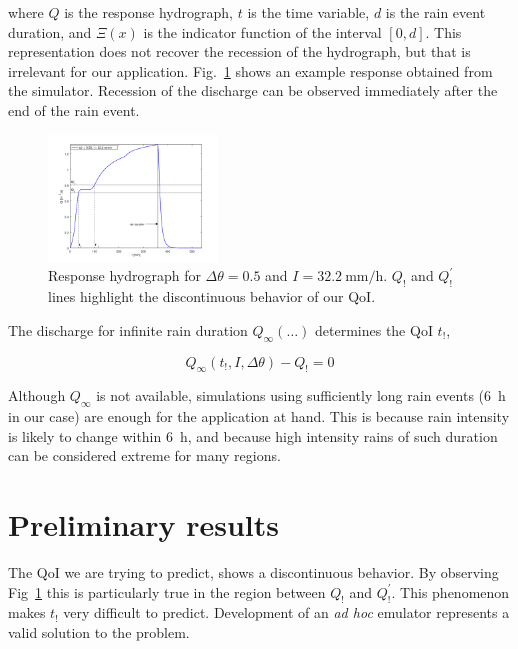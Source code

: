 \documentclass[12pt,a4paper,english,twocolumn,fleqn]{narms}
\newcommand{\jpi}[1]{{\color{Magenta} JPi: #1}}
\begin{document}
\noindent where $Q$ is the response hydrograph, $t$ is the time variable, $d$ is the rain event duration, and $\Xi(x)$ is the indicator function of the interval $[\num{0},d]$.
This representation does not recover the recession of the hydrograph, but that is irrelevant for our application.
Fig.~\ref{img:hydrograph} shows an example response obtained from the simulator.
Recession of the discharge can be observed immediately after the end of the rain event.

\begin{figure}[htpb]
  \centering
  \includegraphics[width=0.4\textwidth]{img/hydrograph.png}
  \caption{Response hydrograph for $\Delta\theta = 0.5$ and $I = \SI{32.2}{\milli\metre\per\hour}$. $Q_!$ and $Q^\prime_!$ lines highlight the discontinuous behavior of our QoI.}
  \label{img:hydrograph}
\end{figure}

The discharge for infinite rain duration $Q_\infty(\ldots)$ determines the QoI $t_!$,

\begin{equation}
Q_\infty (t_!, I, \Delta\theta) - Q_! = 0
\end{equation}

\noindent Although $Q_\infty$ is not available, simulations using sufficiently long rain events (\SI{6}{\hour} in our case) are enough for the application at hand.
This is because rain intensity is likely to change within \SI{6}{\hour}, and because high intensity rains of such duration can be considered extreme for many regions.

\section{Preliminary results}



The QoI we are trying to predict, shows a discontinuous behavior.
By observing Fig~\ref{img:hydrograph} this is particularly true in the region between $Q_!$ and $Q^\prime_!$. 
This phenomenon makes $t_!$ very difficult to predict.
Development of an \textit{ad hoc} emulator represents a valid solution to the problem.
\end{document}
